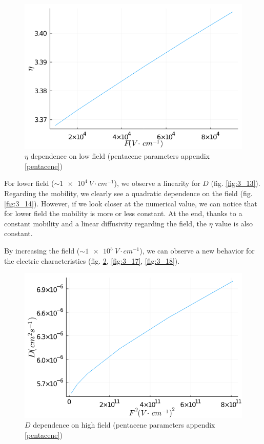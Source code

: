 \begin{figure}[!h]
    \centering
    \includegraphics*[width=.5\paperwidth]{figures/3_elec/ein_field_low.png}
    \caption{$\eta$ dependence on low field (pentacene parameters appendix \ref{pentacene})\label{fig:3_15}}
\end{figure}

For lower field ($\sim \SI{1e4}{V \cdot cm^{-1}}$), we observe a linearity for $D$ (fig. \ref{fig:3_13}). Regarding the mobility, we clearly see a quadratic dependence on the field (fig. \ref{fig:3_14}). However, if we look closer at the numerical value, we can notice that for lower field the mobility is more or less constant. At the end, thanks to a constant mobility and a linear diffusivity regarding the field, the $\eta$ value is also constant.

By increasing the field ($\sim \SI{1e5}{V \cdot cm^{-1}}$), we can observe a new behavior for the electric characteristics (fig. \ref{fig:3_16}, \ref{fig:3_17}, \ref{fig:3_18}).

\begin{figure}[!h]
    \centering
    \includegraphics*[width=.5\paperwidth]{figures/3_elec/d_field_high_square.png}
    \caption{$D$ dependence on high field (pentacene parameters appendix \ref{pentacene})\label{fig:3_16}}
\end{figure}

